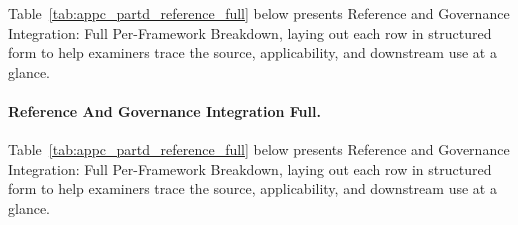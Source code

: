 {\tablestripes\tablefontsize

\noindent Table~\ref{tab:appc_partd_reference_full} below presents Reference and Governance Integration: Full Per-Framework Breakdown, laying out each row in structured form to help examiners trace the source, applicability, and downstream use at a glance. %
\paragraph{Reference And Governance Integration Full.} %
\noindent Table~\ref{tab:appc_partd_reference_full} below presents Reference and Governance Integration: Full Per-Framework Breakdown, laying out each row in structured form to help examiners trace the source, applicability, and downstream use at a glance. %



}
